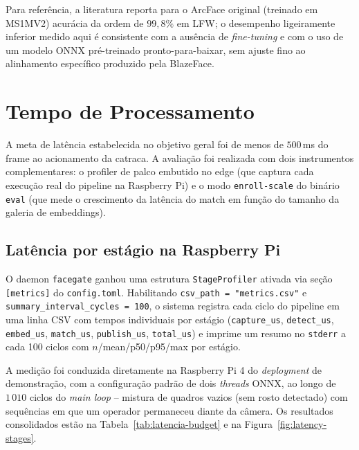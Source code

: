\documentclass[12pt,a4paper]{report}
\begin{document}
Para referência, a literatura reporta para o ArcFace original
(treinado em MS1MV2) acurácia da ordem de $99{,}8\%$ em LFW; o
desempenho ligeiramente inferior medido aqui é consistente com a
ausência de \textit{fine-tuning} e com o uso de um modelo ONNX
pré-treinado pronto-para-baixar, sem ajuste fino ao alinhamento
específico produzido pela BlazeFace.

\section{Tempo de Processamento}
\label{sec:tempo}

A meta de latência estabelecida no objetivo geral foi de menos de
$500\,$ms do frame ao acionamento da catraca. A avaliação foi
realizada com dois instrumentos complementares: o profiler de palco
embutido no edge (que captura cada execução real do pipeline na
Raspberry Pi) e o modo \texttt{enroll-scale} do binário
\texttt{eval} (que mede o crescimento da latência do match em função
do tamanho da galeria de embeddings).

\subsection{Latência por estágio na Raspberry Pi}

O daemon \texttt{facegate} ganhou uma estrutura \texttt{StageProfiler}
ativada via seção \texttt{[metrics]} do \texttt{config.toml}.
Habilitando \texttt{csv\_path = "metrics.csv"} e
\texttt{summary\_interval\_cycles = 100}, o sistema registra cada
ciclo do pipeline em uma linha CSV com tempos individuais por estágio
(\texttt{capture\_us}, \texttt{detect\_us}, \texttt{embed\_us},
\texttt{match\_us}, \texttt{publish\_us}, \texttt{total\_us}) e
imprime um resumo no \texttt{stderr} a cada 100 ciclos com
$n$/mean/p50/p95/max por estágio.

A medição foi conduzida diretamente na Raspberry Pi 4 do
\textit{deployment} de demonstração, com a configuração padrão de
dois \textit{threads} ONNX, ao longo de $1\,010$ ciclos do
\textit{main loop} -- mistura de quadros vazios (sem rosto detectado)
com sequências em que um operador permaneceu diante da câmera. Os
resultados consolidados estão na Tabela~\ref{tab:latencia-budget} e na
Figura~\ref{fig:latency-stages}.
\end{document}
